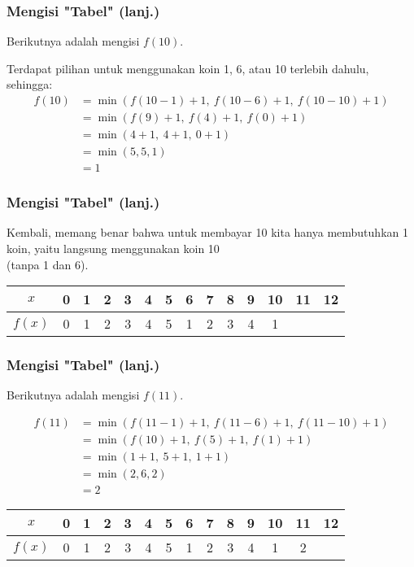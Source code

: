 \begin{frame}
\frametitle{Mengisi "Tabel" (lanj.)}
Berikutnya adalah mengisi $f(10)$.

Terdapat pilihan untuk menggunakan koin 1, 6, atau 10 terlebih dahulu, sehingga:
\begin{align*}
  f(10) &= \min(f(10-1) + 1, \ f(10-6) + 1, \ f(10-10) + 1) \\
  &= \min(f(9) + 1, \ f(4) + 1, \ f(0) + 1) \\
  &= \min(4 + 1, \ 4 + 1, \ 0 + 1) \\
  &= \min(5, 5, 1) \\
  &= 1
\end{align*}
\end{frame}

\begin{frame}
\frametitle{Mengisi "Tabel" (lanj.)}
Kembali, memang benar bahwa untuk membayar 10 kita hanya membutuhkan 1 koin, yaitu langsung menggunakan koin 10 \\ (tanpa 1 dan 6).\newline

\begin{tabular}{|c|c|c|c|c|c|c|c|c|c|c|c|c|c|}
\hline $x$ & 0 & 1 & 2 & 3 & 4 & 5 & 6 & 7 & 8 & 9 & 10 & 11 & 12 \\ 
\hline $f(x)$ &  0 & 1 & 2 & 3 & 4 & 5 & 1 & 2 & 3 & 4 & 1 & & \\ 
\hline 
\end{tabular} 
\end{frame}

\begin{frame}
\frametitle{Mengisi "Tabel" (lanj.)}
Berikutnya adalah mengisi $f(11)$.

\begin{align*}
  f(11) &= \min(f(11-1) + 1, \ f(11-6) + 1, \ f(11-10) + 1) \\
  &= \min(f(10) + 1, \ f(5) + 1, \ f(1) + 1) \\
  &= \min(1 + 1, \ 5 + 1, \ 1 + 1) \\
  &= \min(2, 6, 2) \\
  &= 2
\end{align*}
\begin{tabular}{|c|c|c|c|c|c|c|c|c|c|c|c|c|c|}
\hline $x$ & 0 & 1 & 2 & 3 & 4 & 5 & 6 & 7 & 8 & 9 & 10 & 11 & 12 \\ 
\hline $f(x)$ &  0 & 1 & 2 & 3 & 4 & 5 & 1 & 2 & 3 & 4 & 1 & 2 & \\ 
\hline 
\end{tabular} 
\end{frame}

